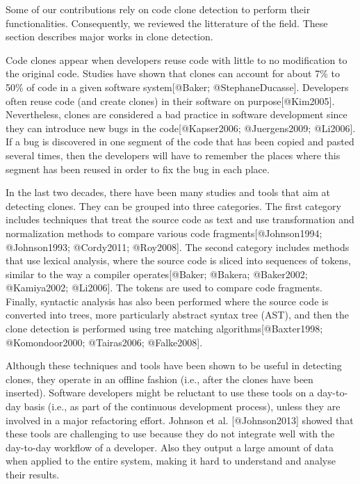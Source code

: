 Some of our contributions rely on code clone detection to perform their
functionalities. Consequently, we reviewed the litterature of the field.
These section describes major works in clone detection.

Code clones appear when developers reuse code with little to no
modification to the original code. Studies have shown that clones can
account for about 7\% to 50\% of code in a given software
system{[}@Baker; @StephaneDucasse{]}. Developers often reuse code (and
create clones) in their software on purpose{[}@Kim2005{]}. Nevertheless,
clones are considered a bad practice in software development since they
can introduce new bugs in the code{[}@Kapser2006; @Juergens2009;
@Li2006{]}. If a bug is discovered in one segment of the code that has
been copied and pasted several times, then the developers will have to
remember the places where this segment has been reused in order to fix
the bug in each place.

In the last two decades, there have been many studies and tools that aim
at detecting clones. They can be grouped into three categories. The
first category includes techniques that treat the source code as text
and use transformation and normalization methods to compare various code
fragments{[}@Johnson1994; @Johnson1993; @Cordy2011; @Roy2008{]}. The
second category includes methods that use lexical analysis, where the
source code is sliced into sequences of tokens, similar to the way a
compiler operates{[}@Baker; @Bakera; @Baker2002; @Kamiya2002;
@Li2006{]}. The tokens are used to compare code fragments. Finally,
syntactic analysis has also been performed where the source code is
converted into trees, more particularly abstract syntax tree (AST), and
then the clone detection is performed using tree matching
algorithms{[}@Baxter1998; @Komondoor2000; @Tairas2006; @Falke2008{]}.

Although these techniques and tools have been shown to be useful in
detecting clones, they operate in an offline fashion (i.e., after the
clones have been inserted). Software developers might be reluctant to
use these tools on a day-to-day basis (i.e., as part of the continuous
development process), unless they are involved in a major refactoring
effort. Johnson et al. {[}@Johnson2013{]} showed that these tools are
challenging to use because they do not integrate well with the
day-to-day workflow of a developer. Also they output a large amount of
data when applied to the entire system, making it hard to understand and
analyse their results.

